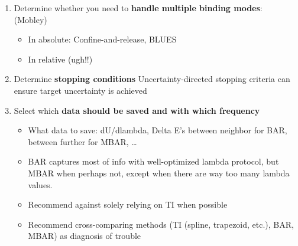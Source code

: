 \documentclass[9pt,bestpractices]{livecoms}
\begin{document}
\begin{enumerate}
\item Determine whether you need to \textbf{handle multiple binding modes}: (Mobley)
\begin{itemize}
\item In absolute: Confine-and-release, BLUES
\item In relative (ugh!!)
\end{itemize}
\item Determine \textbf{stopping conditions}
Uncertainty-directed stopping criteria can ensure target uncertainty is achieved


\item Select which \textbf{data should be saved and with which frequency}
\begin{itemize}
\item What data to save: dU/dlambda, Delta E’s between neighbor for BAR, between further for MBAR, …
\item BAR captures most of info with well-optimized lambda protocol, but MBAR when perhaps not, except when there are way too many lambda values.
\item Recommend against solely relying on TI when possible
\item Recommend cross-comparing methods (TI (spline, trapezoid, etc.), BAR, MBAR) as diagnosis of trouble
\end{itemize}

\end{enumerate}
\end{document}
